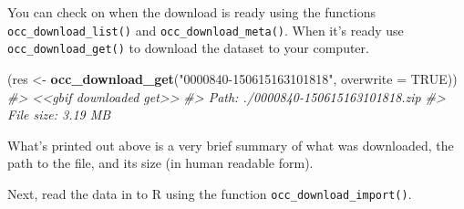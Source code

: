 \documentclass[3p]{elsarticle} %
\newenvironment{Shaded}{\begin{snugshade}}{\end{snugshade}}
\newcommand{\CommentTok}[1]{\textcolor[rgb]{0.56,0.35,0.01}{\textit{#1}}}
\newcommand{\DataTypeTok}[1]{\textcolor[rgb]{0.13,0.29,0.53}{#1}}
\newcommand{\KeywordTok}[1]{\textcolor[rgb]{0.13,0.29,0.53}{\textbf{#1}}}
\newcommand{\NormalTok}[1]{#1}
\newcommand{\OtherTok}[1]{\textcolor[rgb]{0.56,0.35,0.01}{#1}}
\newcommand{\StringTok}[1]{\textcolor[rgb]{0.31,0.60,0.02}{#1}}
\begin{document}
You can check on when the download is ready using the functions
\texttt{occ\_download\_list()} and \texttt{occ\_download\_meta()}. When
it's ready use \texttt{occ\_download\_get()} to download the dataset to
your computer.

\begin{Shaded}
\begin{Highlighting}[]
\NormalTok{(res <{-}}\StringTok{ }\KeywordTok{occ\_download\_get}\NormalTok{(}\StringTok{"0000840{-}150615163101818"}\NormalTok{, }\DataTypeTok{overwrite =} \OtherTok{TRUE}\NormalTok{))}
\CommentTok{\#> <<gbif downloaded get>>}
\CommentTok{\#>   Path: ./0000840{-}150615163101818.zip}
\CommentTok{\#>   File size: 3.19 MB}
\end{Highlighting}
\end{Shaded}

What's printed out above is a very brief summary of what was downloaded,
the path to the file, and its size (in human readable form).

Next, read the data in to R using the function
\texttt{occ\_download\_import()}.
\end{document}
